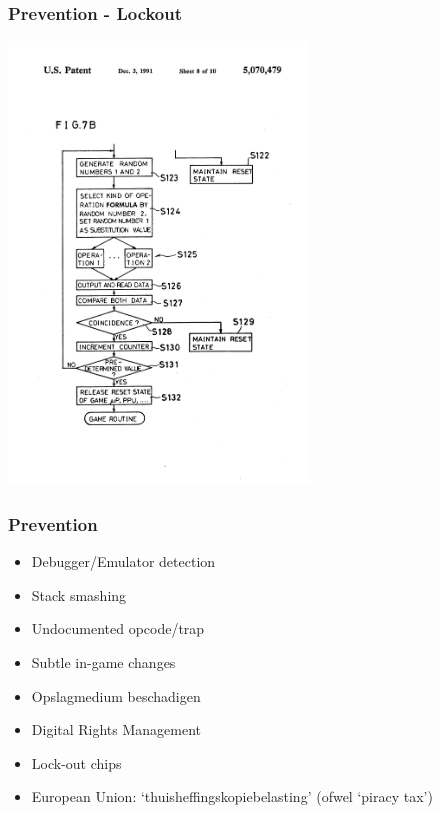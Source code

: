 \documentclass{beamer}
\begin{document}
\begin{frame}
	\frametitle{Prevention - Lockout}

	\begin{center}
	\includegraphics[width=0.6\textwidth]{US5070479-drawings-page-9.png}
	\end{center}
\end{frame}

\begin{frame}
	\frametitle{Prevention}

	\begin{itemize}
		\item Debugger/Emulator detection
		\item Stack smashing
		\item Undocumented opcode/trap
		\item Subtle in-game changes
		\item Opslagmedium beschadigen
		\item Digital Rights Management
		\item Lock-out chips
		\item European Union: `thuisheffingskopiebelasting' (ofwel `piracy tax')
	\end{itemize}
\end{frame}



\end{document}
